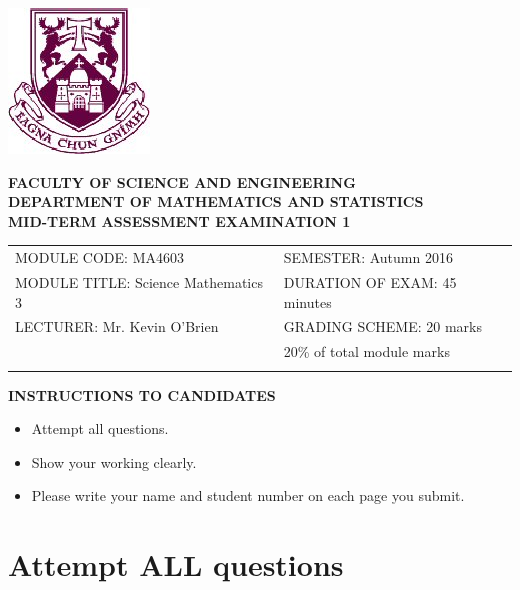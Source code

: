 \documentclass[a4paper,12pt]{article}
\begin{document}
\begin{center}
	\includegraphics[scale=0.60]{images/shieldtransparent2}
\end{center}

\begin{center}
	\vspace{1cm}
	\large \bf {FACULTY OF SCIENCE AND ENGINEERING} \\[0.5cm]
	\normalsize DEPARTMENT OF MATHEMATICS AND STATISTICS \\[1.25cm]
	\large \bf {MID-TERM ASSESSMENT EXAMINATION 1} \\[1.5cm]
\end{center}

\begin{tabular}{ll}
	MODULE CODE: MA4603 & SEMESTER: Autumn 2016\\[1cm]
	MODULE TITLE: Science Mathematics 3  & DURATION OF EXAM: 45 minutes \\[1cm]
	LECTURER: Mr. Kevin O'Brien & GRADING SCHEME: 20 marks \\
	& \phantom{GRadiC} \footnotesize {20\% of total module marks} \\[0.2cm]
	\\[1cm]
\end{tabular}
\begin{center}
	{\bf INSTRUCTIONS TO CANDIDATES}
\end{center}
\begin{itemize}
	\item Attempt all questions.
	\item Show your working clearly.
	\item Please write your name and student number on each page you submit.

\end{itemize}
\newpage
\section*{Attempt ALL questions}
\end{document}

